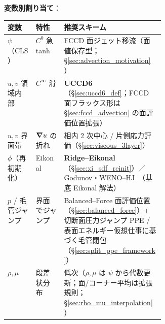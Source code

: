 \noindent\textbf{変数別割り当て}：
\begin{center}
\begin{tabularx}{\linewidth}{@{}>{\raggedright\arraybackslash}p{0.18\linewidth}>{\raggedright\arraybackslash}p{0.18\linewidth}>{\raggedright\arraybackslash}X@{}}
\hline
変数 & 特性 & 推奨スキーム \\
\hline
$\psi$（CLS）& $C^0$ 急 tanh & FCCD 面ジェット移流（面値保存型；\S\ref{sec:advection_motivation}） \\
$u, v$ 領域内部 & $C^\infty$ 滑 & \textbf{UCCD6}（\S\ref{sec:uccd6_def}；FCCD 面フラックス形は \S\ref{sec:fccd_advection} の面評価位置拡張） \\
$u, v$ 界面帯 & $\bm{\nabla} u$ の折れ & 相内 2 次中心 / 片側応力評価（\S\ref{sec:viscous_3layer}） \\
$\phi$（再初期化）& Eikonal & \textbf{Ridge--Eikonal}（\S\ref{sec:xi_sdf_reinit}）／ Godunov・WENO--HJ~\cite{JiangPeng2000}（基底 Eikonal 解法） \\
$p$ / 毛管ジャンプ & 界面でジャンプ & Balanced--Force 面評価位置（\S\ref{sec:balanced_force}）+ 切断面圧力ジャンプ PPE / 表面エネルギー仮想仕事に基づく毛管閉包（\S\ref{sec:split_ppe_framework}）\\
$\rho, \mu$ & 段差状分布 & 低次（$\rho,\mu$ は $\psi$ から代数更新；面/コーナー平均は拡張規則；\S\ref{sec:rho_mu_interpolation}）\\
\hline
\end{tabularx}
\end{center}

